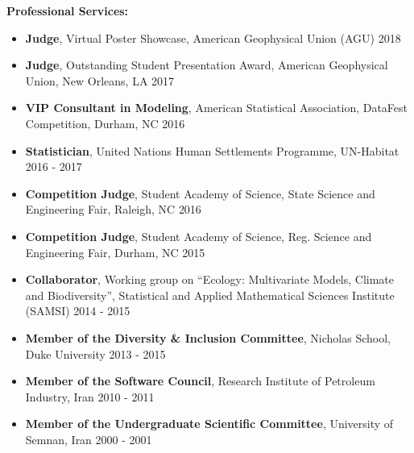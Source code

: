 \documentclass[10pt]{article}
\newenvironment{changemargin}[2]{%
  \begin{list}{}{%
    \setlength{\topsep}{0pt}%
    \setlength{\leftmargin}{#1}%
    \setlength{\rightmargin}{#2}%
    \setlength{\listparindent}{\parindent}%
    \setlength{\itemindent}{\parindent}%
    \setlength{\parsep}{\parskip}%
  }%
  \item[]}{\end{list}
}
\newenvironment{body} {
	\vspace*{-2pt}
	\begin{changemargin}{-0.5in}{-0.5in}
  }
	{\end{changemargin}
}
\begin{document}
\begin{body}
	\textbf{Professional Services:} \\
	\vspace*{-4pt}
		\begin{itemize} \itemsep -0pt
      \item[] 	\textbf{Judge}, Virtual Poster Showcase, American Geophysical Union (AGU) \hfill  {2018}\\
      \item[] 	\textbf{Judge}, Outstanding Student Presentation Award, American Geophysical Union, New Orleans, LA \hfill  {2017}\\
      \item[] 	\textbf{VIP Consultant in Modeling}, American Statistical Association, DataFest Competition, Durham, NC \hfill  {2016}\\
      \item[] 	\textbf{Statistician}, United Nations Human Settlements Programme, UN-Habitat \hfill  {2016 -  2017}\\
      \item[] 	\textbf{Competition Judge}, Student Academy of Science, State Science and Engineering Fair, Raleigh, NC \hfill  {2016}\\
      \item[] 	\textbf{Competition Judge}, Student Academy of Science, Reg. Science and Engineering Fair, Durham, NC \hfill  {2015}\\
      \item[] 	\textbf{Collaborator}, Working group on ``Ecology: Multivariate Models, Climate and Biodiversity'', Statistical and Applied Mathematical Sciences Institute (SAMSI) \hfill  {2014 - 2015}\\
      \item[] 	\textbf{Member of the Diversity \& Inclusion Committee}, Nicholas School, Duke University \hfill  {2013 -  2015}\\
      \item[] 	\textbf{Member of the Software Council}, Research Institute of Petroleum Industry, Iran \hfill  {2010 - 2011}\\
      \item[] 	\textbf{Member of the Undergraduate Scientific Committee}, University of Semnan, Iran \hfill  {2000 -  2001}\\
	\end{itemize}


\end{body}

\medskip
\end{document}
